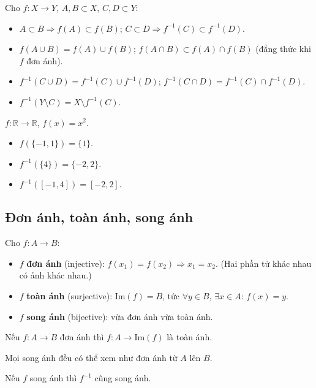 \documentclass[12pt,a4paper]{article}
\begin{document}
\begin{tinhchat}[title={Tính chất ảnh và nghịch ảnh}]
  Cho $f: X \to Y$, $A, B \subset X$, $C, D \subset Y$:
  \begin{itemize}
    \item $A \subset B \Rightarrow f(A) \subset f(B)$; \quad $C \subset D \Rightarrow f^{-1}(C) \subset f^{-1}(D)$.
    \item $f(A \cup B) = f(A) \cup f(B)$; \quad $f(A \cap B) \subset f(A) \cap f(B)$ (đẳng thức khi $f$ đơn ánh).
    \item $f^{-1}(C \cup D) = f^{-1}(C) \cup f^{-1}(D)$; \quad $f^{-1}(C \cap D) = f^{-1}(C) \cap f^{-1}(D)$.
    \item $f^{-1}(Y \setminus C) = X \setminus f^{-1}(C)$.
  \end{itemize}
\end{tinhchat}

\begin{vidu}
  $f: \mathbb{R} \to \mathbb{R}$, $f(x) = x^2$. 
  \begin{itemize}
      \item $f(\{-1, 1\}) = \{1\}$.
      \item $f^{-1}(\{4\}) = \{-2, 2\}$.
      \item $f^{-1}([-1, 4]) = [-2, 2]$.
  \end{itemize}
\end{vidu}

\subsection{Đơn ánh, toàn ánh, song ánh}

\begin{dinhnghia}
  Cho $f: A \to B$:
  \begin{itemize}
    \item $f$ \textbf{đơn ánh} (injective): $f(x_1) = f(x_2) \Rightarrow x_1 = x_2$. (Hai phần tử khác nhau có ảnh khác nhau.)
    \item $f$ \textbf{toàn ánh} (surjective): $\mathrm{Im}(f) = B$, tức $\forall y \in B$, $\exists x \in A$: $f(x) = y$.
    \item $f$ \textbf{song ánh} (bijective): vừa đơn ánh vừa toàn ánh.
  \end{itemize}
\end{dinhnghia}

\begin{tinhchat}
  Nếu $f: A \to B$ đơn ánh thì $f: A \to \mathrm{Im}(f)$ là toàn ánh. 
  
  Mọi song ánh đều có thể xem như đơn ánh từ $A$ lên $B$.

  Nếu $f$ song ánh thì $f^{-1}$ cũng song ánh.
\end{tinhchat}
\end{document}
